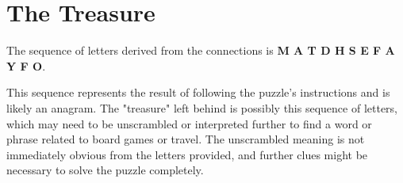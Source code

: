 \documentclass{article}
\begin{document}
\section{The Treasure}

The sequence of letters derived from the connections is \textbf{M A T D H S E F A Y F O}.

This sequence represents the result of following the puzzle's instructions and is likely an anagram. The "treasure" left behind is possibly this sequence of letters, which may need to be unscrambled or interpreted further to find a word or phrase related to board games or travel.  The unscrambled meaning is not immediately obvious from the letters provided, and further clues might be necessary to solve the puzzle completely.
\end{document}
